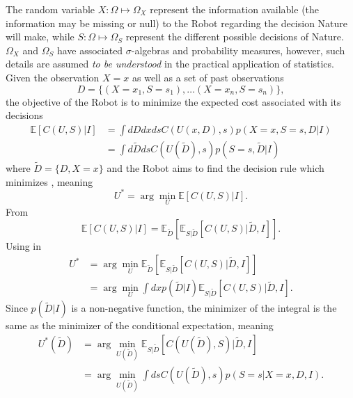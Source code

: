 The random variable $X: \Omega \mapsto \Omega_X$ represent the information available (the information may be missing or null) to the Robot regarding the decision Nature will make, while $S: \Omega \mapsto \Omega_S$ represent the different possible decisions of Nature. $\Omega_X$ and $\Omega_S$ have associated $\sigma$-algebras and probability measures, however, such details are assumed \emph{to be understood} in the practical application of statistics. Given the observation $X=x$ as well as a set of past observations
\begin{equation}
	D = \{(X=x_1,S=s_1),\dots (X=x_n,S=s_n)\},
\end{equation}
the objective of the Robot is to minimize the expected cost associated with its decisions~\cite{murphy2023probabilistic}
\begin{equation}
	\begin{split}
		\mathbb{E}[C(U, S)|I] &= \int dD dx ds  C(U(x,D),s) p(X=x,S=s,D|I)\\
		& = \int d\tilde{D} ds  C(U(\tilde{D}),s) p(S=s,\tilde{D}|I)
	\end{split}
	\label{eq:conditional_expected_cost}
\end{equation}
where $\tilde{D} = \{D,X= x\}$ and the Robot aims to find the decision rule which minimizes , meaning
\begin{equation}
	U^* = \arg\min_{U} \mathbb{E}[C(U, S)|I].
	\label{eq:decision_rule_x}
\end{equation}	
From 
\begin{equation}
	\mathbb{E}[C(U, S)|I] = \mathbb{E}_{\tilde{D}}[\mathbb{E}_{S|\tilde{D}}[C(U, S)|\tilde{D},I]].
	\label{eq:total2}
\end{equation}
Using  in 
\begin{equation}
	\begin{split}
		U^* &= \arg\min_{U} \mathbb{E}_{\tilde{D}}[\mathbb{E}_{S|\tilde{D}}[C(U, S)|\tilde{D},I]]\\
		&= \arg\min_{U} \int dxp(\tilde{D}|I) \mathbb{E}_{S|\tilde{D}}[C(U, S)|\tilde{D},I].
	\end{split}
	\label{eq:decision_rule2}
\end{equation}
Since $p(\tilde{D}|I)$ is a non-negative function, the minimizer of the integral is the same as the minimizer of the conditional expectation, meaning
\begin{equation}
	\begin{split}
		U^*(\tilde{D}) &= \arg\min_{U(\tilde{D})} \mathbb{E}_{S|\tilde{D}}[C(U(\tilde{D}), S)|\tilde{D},I]\\
		& = \arg\min_{U(\tilde{D})}\int  ds C(U(\tilde{D}),s) p(S=s|X=x,D,I).
	\end{split}
	\label{eq:decision_rule3}
\end{equation}
